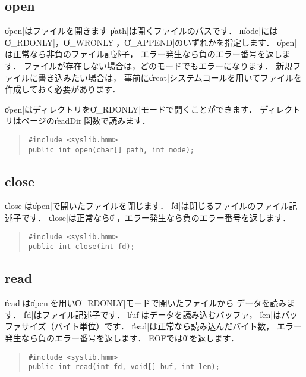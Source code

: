 \subsection{open}

\|open|はファイルを開きます
\|path|は開くファイルのパスです．
\|mode|には\|O_RDONLY|，\|O_WRONLY|，\|O_APPEND|のいずれかを指定します．
\|open|は正常なら非負のファイル記述子，
エラー発生なら負のエラー番号を返します．
ファイルが存在しない場合は，どのモードでもエラーになります．
新規ファイルに書き込みたい場合は，
事前に\|creat|システムコールを用いてファイルを作成しておく必要があります．

\|open|はディレクトリを\|O_RDONLY|モードで開くことができます．
ディレクトリは\pageref{chap4:readDir}ページの\|readDir|関数で読みます．

\begin{quote}
\begin{verbatim}
#include <syslib.hmm>
public int open(char[] path, int mode);
\end{verbatim}
\end{quote}

\subsection{close}

\|close|は\|open|で開いたファイルを閉じます．
\|fd|は閉じるファイルのファイル記述子です．
\|close|は正常なら\|0|，エラー発生なら負のエラー番号を返します．

\begin{quote}
\begin{verbatim}
#include <syslib.hmm>
public int close(int fd);
\end{verbatim}
\end{quote}

\subsection{read}

\|read|は\|open|を用い\|O_RDONLY|モードで開いたファイルから
データを読みます．
\|fd|はファイル記述子です．
\|buf|はデータを読み込むバッファ，
\|len|はバッファサイズ（バイト単位）です．
\|read|は正常なら読み込んだバイト数，
エラー発生なら負のエラー番号を返します．
EOFでは\|0|を返します．

\begin{quote}
\begin{verbatim}
#include <syslib.hmm>
public int read(int fd, void[] buf, int len);
\end{verbatim}
\end{quote}

